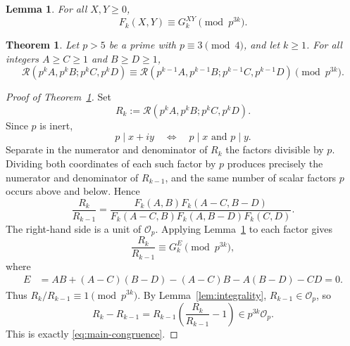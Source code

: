 \documentclass[10pt,a4paper]{amsart}
\newtheorem{theorem}{Theorem}
\newtheorem{lemma}{Lemma}
\newcommand{\Op}{\mathcal O_p}
\newcommand{\Rect}{\mathcal R}
\begin{document}
\begin{lemma}\label{lem:complete-rectangles}
For all $X,Y\geq0$,
\begin{equation}\label{eq:Fk-congruence}
F_k(X,Y)\equiv G_k^{XY}\pmod{p^{3k}}.
\end{equation}
\end{lemma}

\begin{theorem}\label{thm:ljunggren}
Let $p>5$ be a prime with $p\equiv3\pmod4$, and let $k\geq1$. For all integers $A\geq C\geq1$ and $B\geq D\geq1$,
\begin{equation}\label{eq:main-congruence}
\Rect(p^kA,p^kB;p^kC,p^kD)
\equiv
\Rect(p^{k-1}A,p^{k-1}B;p^{k-1}C,p^{k-1}D)
\pmod{p^{3k}}.
\end{equation}
\end{theorem}

\begin{proof}[Proof of Theorem~\ref{thm:ljunggren}]
Set
\[
R_k:=\Rect(p^kA,p^kB;p^kC,p^kD).
\]
Since $p$ is inert,
\[
p\mid x+iy
\quad\Longleftrightarrow\quad
p\mid x\text{ and }p\mid y.
\]
Separate in the numerator and denominator of $R_k$ the factors divisible by $p$. Dividing both coordinates of each such factor by $p$ produces precisely the numerator and denominator of $R_{k-1}$, and the same number of scalar factors $p$ occurs above and below. Hence
\begin{equation}\label{eq:R-ratio-units}
\frac{R_k}{R_{k-1}}
=
\frac{F_k(A,B)F_k(A-C,B-D)}
{F_k(A-C,B)F_k(A,B-D)F_k(C,D)}.
\end{equation}
The right-hand side is a unit of $\Op$. Applying Lemma~\ref{lem:complete-rectangles} to each factor gives
\[
\frac{R_k}{R_{k-1}}
\equiv
G_k^E
\pmod{p^{3k}},
\]
where
\begin{align*}
E
&=AB+(A-C)(B-D)-(A-C)B-A(B-D)-CD
=0.
\end{align*}
Thus $R_k/R_{k-1}\equiv1\pmod{p^{3k}}$. By Lemma~\ref{lem:integrality}, $R_{k-1}\in\Op$, so
\[
R_k-R_{k-1}
=R_{k-1}\left(\frac{R_k}{R_{k-1}}-1\right)
\in p^{3k}\Op.
\]
This is exactly \eqref{eq:main-congruence}.
\end{proof}
\end{document}
